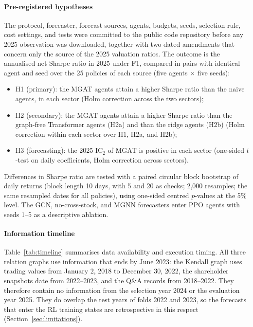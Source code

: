 \documentclass[pdflatex,sn-mathphys-num]{sn-jnl}%
\theoremstyle{thmstyleone}%
\theoremstyle{thmstyletwo}%
\theoremstyle{thmstylethree}%
\begin{document}
\paragraph{Pre-registered hypotheses}\label{subsec:hypotheses}
{\color{blue}
The protocol, forecaster, forecast sources, agents, budgets, seeds, selection rule, cost settings, and tests were committed to the public code repository before any 2025 observation was downloaded, together with two dated amendments that concern only the source of the 2025 valuation ratios. The outcome is the annualised net Sharpe ratio in 2025 under F1, compared in pairs with identical agent and seed over the 25 policies of each source (five agents $\times$ five seeds):
\begin{itemize}
\item H1 (primary): the MGAT agents attain a higher Sharpe ratio than the naive agents, in each sector (Holm correction across the two sectors);
\item H2 (secondary): the MGAT agents attain a higher Sharpe ratio than the graph-free Transformer agents (H2a) and than the ridge agents (H2b) (Holm correction within each sector over H1, H2a, and H2b);
\item H3 (forecasting): the 2025 IC$_2$ of MGAT is positive in each sector (one-sided $t$-test on daily coefficients, Holm correction across sectors).
\end{itemize}
Differences in Sharpe ratio are tested with a paired circular block bootstrap of daily returns (block length 10 days, with 5 and 20 as checks; 2{,}000 resamples; the same resampled dates for all policies), using one-sided centred $p$-values at the 5\% level. The GCN, no-cross-stock, and MGNN forecasters enter PPO agents with seeds 1--5 as a descriptive ablation.
\par}

\paragraph{Information timeline}
{\color{blue}
Table~\ref{tab:timeline} summarises data availability and execution timing. All three relation graphs use information that ends by June 2023: the Kendall graph uses trading values from January 2, 2018 to December 30, 2022, the shareholder snapshots date from 2022--2023, and the Q\&A records from 2018--2022. They therefore contain no information from the selection year 2024 or the evaluation year 2025. They do overlap the test years of folds 2022 and 2023, so the forecasts that enter the RL training states are retrospective in this respect (Section~\ref{sec:limitations}).
\par}
\end{document}
